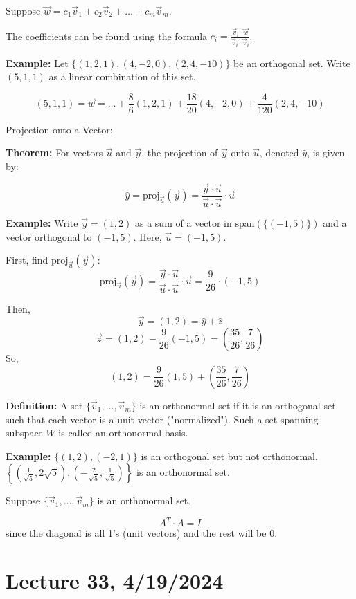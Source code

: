 \documentclass{article}
\begin{document}
Suppose \( \vec{w} = c_1\vec{v}_1 + c_2\vec{v}_2 + \ldots + c_m\vec{v}_m \). 

The coefficients can be found using the formula \( c_i = \frac{\vec{v}_i \cdot \vec{w}}{\vec{v}_i \cdot \vec{v}_i} \).

\textbf{Example:} Let \( \{(1, 2, 1), (4, -2, 0), (2, 4, -10)\} \) be an orthogonal set. Write \( (5, 1, 1) \) as a linear combination of this set.

\[ (5, 1, 1) = \vec{w} = \ldots + \frac{8}{6}(1,2,1) + \frac{18}{20}(4, -2, 0) + \frac{4}{120}(2, 4, -10) \]

Projection onto a Vector:

\textbf{Theorem:} For vectors \( \vec{u} \) and \( \vec{y} \), the projection of \( \vec{y} \) onto \( \vec{u} \), denoted \( \hat{y} \), is given by:

\[ \hat{y} = \text{proj}_{\vec{u}}(\vec{y}) = \frac{\vec{y} \cdot \vec{u}}{\vec{u} \cdot \vec{u}} \cdot \vec{u} \]

\textbf{Example:} Write \( \vec{y} = (1,2) \) as a sum of a vector in \( \text{span}(\{(-1, 5)\}) \) and a vector orthogonal to \( (-1,5) \). Here, \( \vec{u} = (-1, 5) \).

First, find \( \text{proj}_{\vec{u}}(\vec{y}) \):
\[ \text{proj}_{\vec{u}}(\vec{y}) = \frac{\vec{y} \cdot \vec{u}}{\vec{u} \cdot \vec{u}} \cdot \vec{u} = \frac{9}{26} \cdot (-1, 5) \]

Then, 
\[ \vec{y} = (1,2) = \hat{y} + \hat{z} \]
\[ \vec{z} = (1, 2) - \frac{9}{26} (-1, 5) = \left( \frac{35}{26}, \frac{7}{26} \right) \]
So, 
\[ (1, 2) = \frac{9}{26} (1, 5) + \left( \frac{35}{26}, \frac{7}{26} \right) \]

\textbf{Definition:} A set \( \{\vec{v}_1, \ldots, \vec{v}_m\} \) is an orthonormal set if it is an orthogonal set such that each vector is a unit vector ("normalized"). Such a set spanning subspace \( W \) is called an orthonormal basis.

\textbf{Example:} \( \{(1, 2), (-2, 1)\} \) is an orthogonal set but not orthonormal. \( \left\{\left(\frac{1}{\sqrt{5}}, 2\sqrt{5}\right), \left(-\frac{2}{\sqrt{5}}, \frac{1}{\sqrt{5}}\right)\right\} \) is an orthonormal set.

Suppose \( \{\vec{v}_1, \ldots, \vec{v}_m\} \) is an orthonormal set. 

\[ A^T \cdot A = I \] 
since the diagonal is all 1's (unit vectors) and the rest will be 0.


\section{Lecture 33, 4/19/2024}
\end{document}
